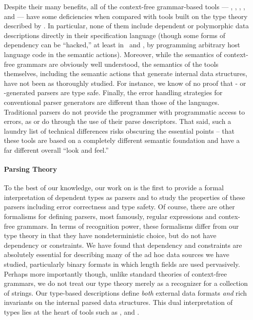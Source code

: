 Despite their many benefits, 
all of the context-free grammar-based tools --- \lex{}, \yacc, 
\antlr, \sablecc, and \demeter{} --- have some deficiencies when compared with
tools built on the type theory described by \ddc. 
In particular, none of them include dependent or 
polymorphic data descriptions directly in their specification language
(though some forms of dependency can be ``hacked,'' at least in
\lex\ and \yacc, by programming arbitrary host language 
code in the semantic actions).  Moreover, while the semantics of
context-free grammars are obviously well understood, the semantics of the
tools themselves, including the semantic actions that generate 
internal data structures, have not been as thoroughly studied.
For instance, we know of no proof that \antlr{}- or 
\sablecc{}-generated parsers are type safe.
Finally, the error handling strategies for conventional
parser generators are different than
those of the \pads{} languages.  Traditional parsers 
do not provide the programmer with
programmatic access to errors, as \padsml{} or \padsc{} do through the
use of their parse
descriptors.  That said, such a laundry list of technical differences risks
obscuring the essential points -- that these tools are based on a 
completely different semantic foundation and have a far different
overall ``look and feel.'' 

\paragraph*{Parsing Theory}
To the best of our knowledge, our work on \ddc{} is the first to
provide a formal interpretation of dependent types as parsers and to
study the properties of these parsers including error correctness and
type safety. Of course, there are other formalisms for defining
parsers, most famously, regular expressions and contex-free grammars.
In terms of recognition power, these formalisms differ from our type
theory in that they have nondeterministic choice, but do not have
dependency or constraints.  We have found that dependency and
constraints are absolutely essential for describing many of the ad hoc
data sources we have studied, particularly binary formats in which
length fields are used pervasively.  Perhaps more importantly though, unlike
standard theories of context-free grammars, we do not treat our type
theory merely as a recognizer for a collection of strings.  Our
type-based descriptions define {\em both} external data formats {\em
  and} rich invariants on the internal parsed data structures.  This
dual interpretation of types lies at the heart of tools such as \pads,
\datascript{} and \packettypes{}.

